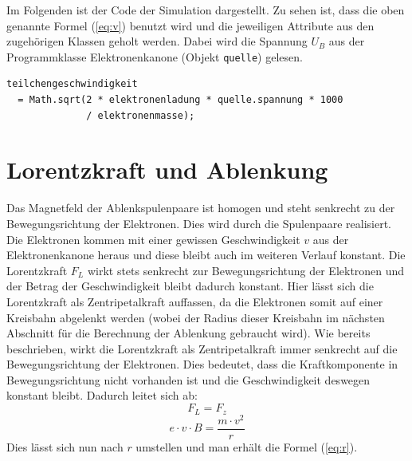 
Im Folgenden ist der Code der Simulation dargestellt.
Zu sehen ist, dass die oben genannte Formel (\ref{eq:v}) benutzt wird und die jeweiligen Attribute aus den zugehörigen Klassen geholt werden.
Dabei wird die Spannung $U_B$ aus der Programmklasse Elektronenkanone (Objekt \lstinline$quelle$) gelesen.

\begin{lstlisting}
teilchengeschwindigkeit 
  = Math.sqrt(2 * elektronenladung * quelle.spannung * 1000 
              / elektronenmasse);
\end{lstlisting}

\section{Lorentzkraft und Ablenkung}
\label{sec:a}

Das Magnetfeld der Ablenkspulenpaare ist homogen und steht senkrecht zu der Bewegungsrichtung der Elektronen.
Dies wird durch die Spulenpaare realisiert.
Die Elektronen kommen mit einer gewissen Geschwindigkeit $v$ aus der Elektronenkanone heraus und diese bleibt auch im weiteren Verlauf konstant.
Die Lorentzkraft $F_L$ wirkt stets senkrecht zur Bewegungsrichtung der Elektronen und der Betrag der Geschwindigkeit bleibt dadurch konstant.
Hier lässt sich die Lorentzkraft als Zentripetalkraft auffassen, da die Elektronen somit auf einer Kreisbahn abgelenkt werden (wobei der Radius dieser Kreisbahn im nächsten Abschnitt für die Berechnung der Ablenkung gebraucht wird).
Wie bereits beschrieben, wirkt die Lorentzkraft als Zentripetalkraft immer senkrecht auf die Bewegungsrichtung der Elektronen.
Dies bedeutet, dass die Kraftkomponente in Bewegungsrichtung nicht vorhanden ist und die Geschwindigkeit deswegen konstant bleibt.
Dadurch leitet sich ab: 
\begin{equation}
\label{eq:Kraft}
   F_L=F_z 
\end{equation}
$$ e \cdot v \cdot B = \frac{m \cdot v^2}{r}$$
Dies lässt sich nun nach $r$ umstellen und man erhält die Formel (\ref{eq:r}).   


